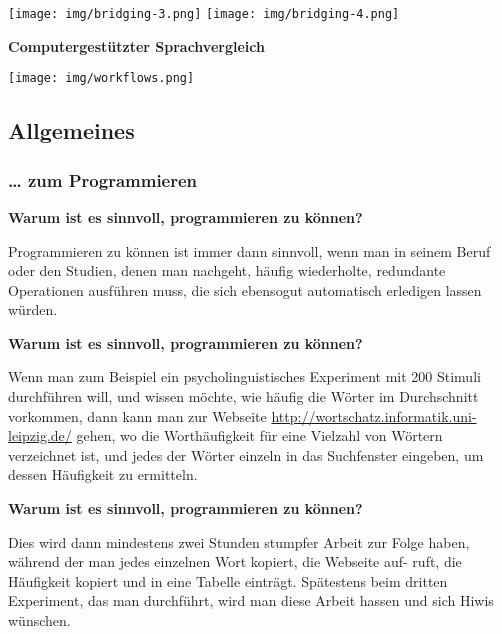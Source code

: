 \texttt{[image: img/bridging-3.png]}
\texttt{[image: img/bridging-4.png]}
\pagebreak
\vspace{0.5cm}\par\noindent\textbf{Computergestützter Sprachvergleich}\vspace{0.5cm}

\texttt{[image: img/workflows.png]}
\subsection{Allgemeines}

\subsubsection{\texorpdfstring{{\ldots{} zum
Programmieren}}{\ldots{} zum Programmieren}}

\vspace{0.5cm}\par\noindent\textbf{Warum ist es sinnvoll, programmieren zu können?}\vspace{0.5cm}

{Programmieren zu können ist immer dann sinnvoll, wenn man in seinem
Beruf oder den Studien, denen man nachgeht, häufig wiederholte,
redundante Operationen ausführen muss, die sich ebensogut automatisch
erledigen lassen würden.}



\vspace{0.5cm}\par\noindent\textbf{Warum ist es sinnvoll, programmieren zu können?}\vspace{0.5cm}

Wenn man zum Beispiel ein psycholinguistisches Experiment mit 200
Stimuli durchführen will, und wissen möchte, wie häufig die Wörter im
Durchschnitt vorkommen, dann kann man zur Webseite
\url{http://wortschatz.informatik.uni-leipzig.de/} gehen, wo die
Worthäufigkeit für eine Vielzahl von Wörtern verzeichnet ist, und jedes
der Wörter einzeln in das Suchfenster eingeben, um dessen Häufigkeit zu
ermitteln.



\vspace{0.5cm}\par\noindent\textbf{Warum ist es sinnvoll, programmieren zu können?}\vspace{0.5cm}

Dies wird dann mindestens zwei Stunden stumpfer Arbeit zur Folge haben,
während der man jedes einzelnen Wort kopiert, die Webseite auf- ruft,
die Häufigkeit kopiert und in eine Tabelle einträgt. Spätestens beim
dritten Experiment, das man durchführt, wird man diese Arbeit hassen und
sich Hiwis wünschen.



